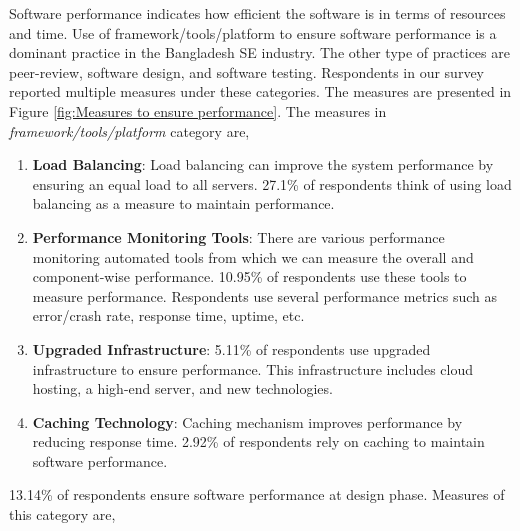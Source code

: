 Software performance indicates how efficient the software is in terms of resources and time. Use of framework/tools/platform to ensure software performance is a dominant practice in the Bangladesh SE industry. The other type of practices are peer-review, software design, and software testing. Respondents in our survey reported multiple measures under these categories.
The measures are presented in Figure \ref{fig:Measures to ensure performance}. The measures in \emph{framework/tools/platform} category are,
\begin{enumerate}[label=(\alph*)]

    \item \textbf{Load Balancing}: Load balancing can improve the system performance by ensuring an equal load to all servers. 27.1\% of respondents think of using load balancing as a measure to maintain performance.
    
    
    \item \textbf{Performance Monitoring Tools}: There are various performance monitoring automated tools from which we can measure the overall and component-wise performance. 10.95\% of respondents use these tools to measure performance. Respondents use several performance metrics such as error/crash rate, response time, uptime, etc.
    
    \item \textbf{Upgraded Infrastructure}: 5.11\% of respondents use upgraded infrastructure to ensure performance. This infrastructure includes cloud hosting, a high-end server, and new technologies.
    
    \item \textbf{Caching Technology}: Caching mechanism improves performance by reducing response time. 2.92\% of respondents rely on caching to maintain software performance.

\end{enumerate}


13.14\% of respondents ensure software performance  at design phase. Measures of this category are,

